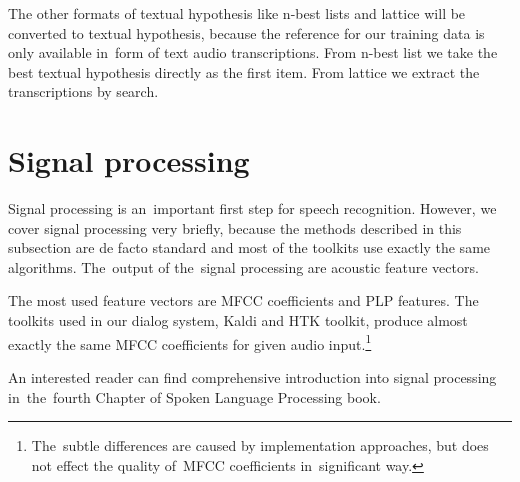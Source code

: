 The other formats of textual hypothesis like n-best lists and lattice
will be converted to textual hypothesis, because the reference for our training data is only available  
in~form of text audio transcriptions.
From n-best list we take the best textual hypothesis directly as the first item. From lattice
we extract the transcriptions by search.  


\section{Signal processing}
\label{sub:signal}
Signal processing is an~important first step for speech recognition. However, we cover signal processing very briefly, 
because the methods described in this subsection are de facto standard and most of the toolkits use exactly the same 
algorithms. The~output of the~signal processing are acoustic feature vectors. 


The most used feature vectors are \ac{MFCC} coefficients and \ac{PLP} features. The toolkits used in our dialog system, 
Kaldi and \ac{HTK} toolkit, produce almost exactly the same \ac{MFCC} coefficients for given audio 
input.\footnote{The~subtle differences are caused by implementation approaches, but does not effect the quality 
    of~\ac{MFCC} coefficients in~significant way.}

An interested reader can find comprehensive introduction into signal processing 
in~the~fourth Chapter of Spoken Language Processing book\cite{huang2001spoken}.



